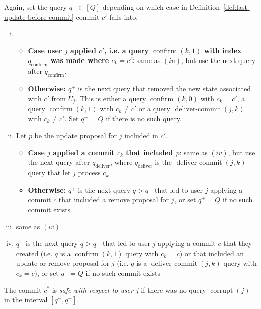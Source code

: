 \begin{definition}
	Again, set the query $q^+ \in [Q]$ depending on which case in Definition~\ref{def:last-update-before-commit} commit $c'$ falls into:
	\begin{enumerate}[(i)]
		\item \begin{itemize}
			      \item \textbf{Case user $j$ applied $c'$, i.e. a query $\operatorname{confirm}(k, 1)$ with index $q_{\mathrm{confirm}}$ was made where $c_k = c'$:} same as $(iv)$, but use the next query after $q_{\mathrm{confirm}}$.
			      \item \textbf{Otherwise:} $q^+$ is the next query that removed the new state associated with $c'$ from $U_j$. This is either a query $\operatorname{confirm}(k, 0)$ with $c_k = c'$, a query $\operatorname{confirm}(k, 1)$ with $c_k \neq c'$ or a query $\operatorname{deliver-commit}(j, k)$ with $c_k \neq c'$. Set $q^+ = Q$ if there is no such query.
		      \end{itemize}
		\item Let $p$ be the update proposal for $j$ included in $c'$.
		      \begin{itemize}
			      \item \textbf{Case $j$ applied a commit $c_k$ that included $p$}: same as $(iv)$, but use the next query after $q_{\mathrm{deliver}}$, where $q_{\mathrm{deliver}}$ is the $\operatorname{deliver-commit}(j, k)$ query that let $j$ process $c_k$
			      \item \textbf{Otherwise:} $q^+$ is the next query $q > q^-$ that led to user $j$ applying a commit $c$ that included a remove proposal for $j$, or set $q^+ = Q$ if no such commit exists 
		      \end{itemize}
		\item same as $(iv)$ 
		\item $q^+$ is the next query $q > q^-$ that led to user $j$ applying a commit $c$ that they created (i.e. $q$ is a $\operatorname{confirm}(k, 1)$ query with $c_k = c$) or that included an update or remove proposal for $j$ (i.e. $q$ is a $\operatorname{deliver-commit}(j, k)$ query with $c_k = c$), or set $q^+ = Q$ if no such commit exists
	\end{enumerate}

	The commit $c^*$ is \emph{safe with respect to user $j$} if there was no query $\operatorname{corrupt}(j)$ in the interval $[q^-, q^+]$.
\end{definition}

